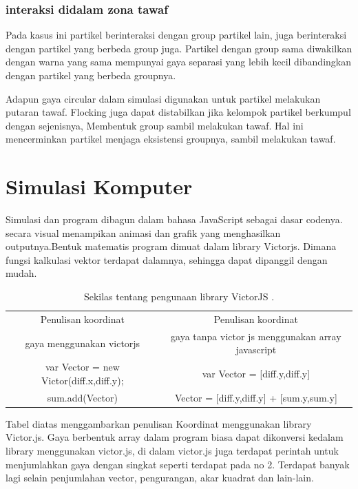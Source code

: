 \subsubsection{interaksi didalam zona tawaf}
\hspace{0.6cm} Pada kasus ini partikel berinteraksi dengan group partikel lain, juga berinteraksi dengan partikel yang berbeda group juga. Partikel dengan group sama diwakilkan dengan warna yang sama mempunyai gaya separasi yang lebih kecil dibandingkan dengan partikel yang berbeda groupnya. 

Adapun gaya circular dalam simulasi digunakan untuk partikel melakukan putaran tawaf. Flocking juga dapat distabilkan jika kelompok partikel berkumpul dengan sejenisnya, Membentuk group sambil melakukan tawaf. Hal ini mencerminkan partikel menjaga eksistensi groupnya, sambil melakukan tawaf.

\section{Simulasi Komputer}
\hspace{0.6cm}Simulasi dan program dibagun dalam bahasa JavaScript sebagai dasar codenya. secara visual menampikan animasi dan grafik yang menghasilkan outputnya.Bentuk matematis program dimuat dalam library Victorjs. Dimana fungsi kalkulasi vektor terdapat dalamnya, sehingga dapat dipanggil dengan mudah.

\begin{table}
\centering
\caption{Sekilas tentang pengunaan library VictorJS .}
\begin{center}
\begin{tabular}{|c|c|}
\hline
Penulisan koordinat  & Penulisan koordinat\\
gaya menggunakan victorjs &  gaya tanpa victor js menggunakan array javascript\\
\hline
var Vector = new Victor(diff.x,diff.y); & var Vector = [diff.y,diff.y] \\
\hline
\hline
sum.add(Vector) & Vector = [diff.y,diff.y] + [sum.y,sum.y]  \\
\hline
\end{tabular}
\end{center}
\end{table}

\hspace{0.6cm}Tabel diatas menggambarkan penulisan Koordinat menggunakan library Victor.js\citep{noauthororeditor2014victorjs}. Gaya berbentuk array dalam program biasa dapat dikonversi kedalam library menggunakan victor.js, di dalam victor.js juga terdapat perintah untuk menjumlahkan gaya dengan singkat seperti terdapat pada no 2. Terdapat banyak lagi selain penjumlahan vector, pengurangan, akar kuadrat dan lain-lain.  



